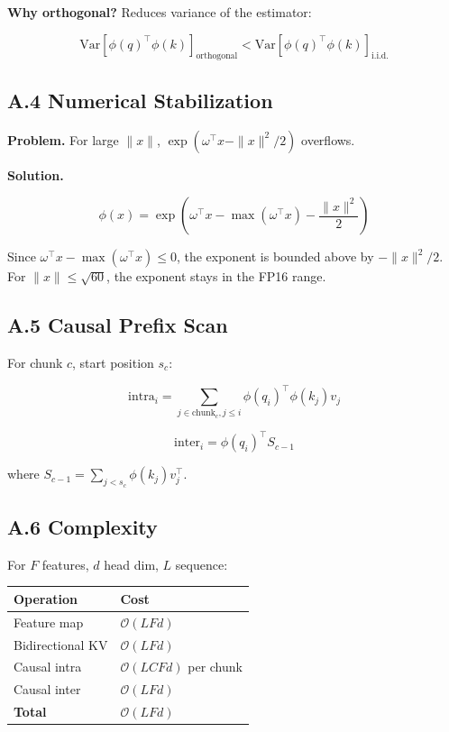 \textbf{Why orthogonal?} Reduces variance of the estimator:

\[
\text{Var}[\phi(q)^\top \phi(k)]_{\text{orthogonal}} < \text{Var}[\phi(q)^\top \phi(k)]_{\text{i.i.d.}}
\tag{A.4}
\]

\subsection{A.4 Numerical Stabilization}

\textbf{Problem.} For large $\|x\|$, $\exp(\omega^\top x - \|x\|^2/2)$ overflows.

\textbf{Solution.}

\[
\phi(x) = \exp\!\left(\omega^\top x - \max(\omega^\top x) - \frac{\|x\|^2}{2}\right)
\tag{A.5}
\]

Since $\omega^\top x - \max(\omega^\top x) \leq 0$, the exponent is bounded 
above by $-\|x\|^2/2$. For $\|x\| \leq \sqrt{60}$, the exponent stays in 
the FP16 range.

\subsection{A.5 Causal Prefix Scan}

For chunk $c$, start position $s_c$:

\[
\text{intra}_i = \sum_{j \in \text{chunk}_c, j \leq i} \phi(q_i)^\top \phi(k_j) v_j
\tag{A.6}
\]

\[
\text{inter}_i = \phi(q_i)^\top S_{c-1}
\tag{A.7}
\]

where $S_{c-1} = \sum_{j < s_c} \phi(k_j) v_j^\top$.

\subsection{A.6 Complexity}

For $F$ features, $d$ head dim, $L$ sequence:

\begin{table}[H]
\centering
\small
\begin{tabular}{ll}
\toprule
\textbf{Operation} & \textbf{Cost} \\
\midrule
Feature map & $\mathcal{O}(L F d)$ \\
Bidirectional KV & $\mathcal{O}(L F d)$ \\
Causal intra & $\mathcal{O}(L C F d)$ per chunk \\
Causal inter & $\mathcal{O}(L F d)$ \\
\textbf{Total} & $\mathcal{O}(L F d)$ \\
\bottomrule
\end{tabular}
\end{table}


